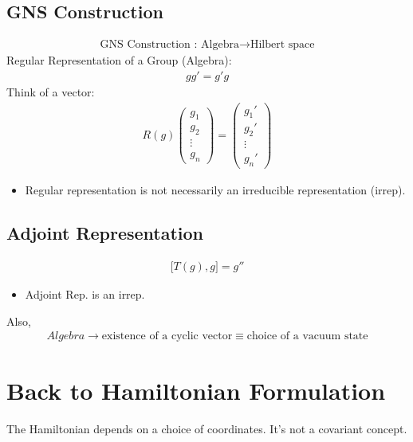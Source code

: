 \documentclass[14pt]{article} %
\begin{document}
\begin{tcolorbox}
\subsection*{GNS Construction}
\begin{align*}\text{GNS Construction : Algebra} \rightarrow \text{Hilbert space} \end{align*}
Regular Representation of a Group (Algebra):
\begin{align*}
gg' = g' g
\end{align*}
Think of a vector:
\begin{align*}
R(g)
\begin{pmatrix}
g_1 \\
g_2 \\
\vdots \\
g_n
\end{pmatrix}
=
\begin{pmatrix}
g_1' \\
g_2' \\
\vdots \\
g_n'
\end{pmatrix}
\end{align*}
\begin{itemize}
    \item Regular representation is not necessarily an irreducible representation (irrep).
\end{itemize}

\subsection*{Adjoint Representation}
\begin{align*}
\big[T(g), g\big] = g''
\end{align*}
\begin{itemize}
    \item Adjoint Rep. is an irrep.
\end{itemize}
Also,
\begin{align*}Algebra \to \text{existence of a cyclic vector} \equiv \text{choice of a vacuum state}
\end{align*}
\end{tcolorbox}

\section*{Back to Hamiltonian Formulation}
The Hamiltonian depends on a choice of coordinates. It's not a covariant concept.
\end{document}

